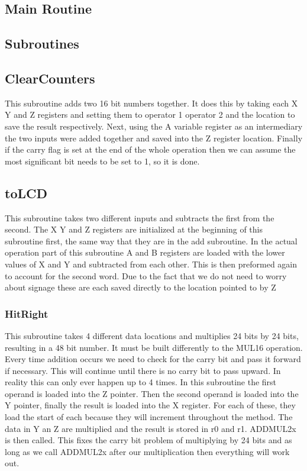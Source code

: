 \documentclass[12pt,letterpaper]{article}
\begin{document}
\subsection{Main Routine}



\subsection{Subroutines}
	\subsection{ClearCounters}
	This subroutine adds two 16 bit numbers together. It does this by taking each X Y and Z registers and setting them to operator 1 operator 2 and the location to save the result respectively. Next, using the A variable register as an intermediary the two inputs were added together and saved into the Z register location. Finally if the carry flag is set at the end of the whole operation then we can assume the most significant bit needs to be set to 1, so it is done. 
	
	\subsection{toLCD}
  	This subroutine takes two different inputs and subtracts the first from the second. The X Y and Z registers are initialized at the beginning of this subroutine first, the same way that they are in the add subroutine. In the actual operation part of this subroutine A and B registers are loaded with the lower values of X and Y and subtracted from each other. This is then preformed again to account for the second word. Due to the fact that we do not need to worry about signage these are each saved directly to the location pointed to by Z 

	\subsubsection{HitRight}
	This subroutine takes 4 different data locations and multiplies 24 bits by 24 bits, resulting in a 48 bit number. It must be built differently to the MUL16 operation. Every time addition occurs  we need to check for the carry bit and pass it forward if necessary. This will continue until there is no carry bit to pass upward. In reality this can only ever happen up to 4 times. In this subroutine the first operand is loaded into the Z pointer. Then the second operand is loaded into the Y pointer, finally the result is loaded into the X register. For each of these, they load the start of each because they will increment throughout the method. The data in Y an Z are multiplied and the result is stored in r0 and r1. ADDMUL2x is then called. This fixes the carry bit problem of multiplying by 24 bits and as long as we call ADDMUL2x after our multiplication then everything will work out. 
	 
\end{document}

